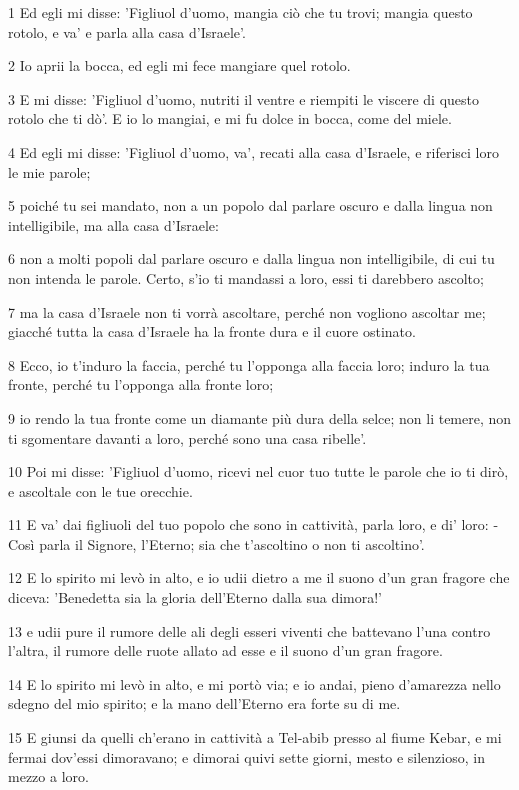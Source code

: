 \par 1 Ed egli mi disse: 'Figliuol d'uomo, mangia ciò che tu trovi; mangia questo rotolo, e va' e parla alla casa d'Israele'.
\par 2 Io aprii la bocca, ed egli mi fece mangiare quel rotolo.
\par 3 E mi disse: 'Figliuol d'uomo, nutriti il ventre e riempiti le viscere di questo rotolo che ti dò'. E io lo mangiai, e mi fu dolce in bocca, come del miele.
\par 4 Ed egli mi disse: 'Figliuol d'uomo, va', recati alla casa d'Israele, e riferisci loro le mie parole;
\par 5 poiché tu sei mandato, non a un popolo dal parlare oscuro e dalla lingua non intelligibile, ma alla casa d'Israele:
\par 6 non a molti popoli dal parlare oscuro e dalla lingua non intelligibile, di cui tu non intenda le parole. Certo, s'io ti mandassi a loro, essi ti darebbero ascolto;
\par 7 ma la casa d'Israele non ti vorrà ascoltare, perché non vogliono ascoltar me; giacché tutta la casa d'Israele ha la fronte dura e il cuore ostinato.
\par 8 Ecco, io t'induro la faccia, perché tu l'opponga alla faccia loro; induro la tua fronte, perché tu l'opponga alla fronte loro;
\par 9 io rendo la tua fronte come un diamante più dura della selce; non li temere, non ti sgomentare davanti a loro, perché sono una casa ribelle'.
\par 10 Poi mi disse: 'Figliuol d'uomo, ricevi nel cuor tuo tutte le parole che io ti dirò, e ascoltale con le tue orecchie.
\par 11 E va' dai figliuoli del tuo popolo che sono in cattività, parla loro, e di' loro: - Così parla il Signore, l'Eterno; sia che t'ascoltino o non ti ascoltino'.
\par 12 E lo spirito mi levò in alto, e io udii dietro a me il suono d'un gran fragore che diceva: 'Benedetta sia la gloria dell'Eterno dalla sua dimora!'
\par 13 e udii pure il rumore delle ali degli esseri viventi che battevano l'una contro l'altra, il rumore delle ruote allato ad esse e il suono d'un gran fragore.
\par 14 E lo spirito mi levò in alto, e mi portò via; e io andai, pieno d'amarezza nello sdegno del mio spirito; e la mano dell'Eterno era forte su di me.
\par 15 E giunsi da quelli ch'erano in cattività a Tel-abib presso al fiume Kebar, e mi fermai dov'essi dimoravano; e dimorai quivi sette giorni, mesto e silenzioso, in mezzo a loro.
